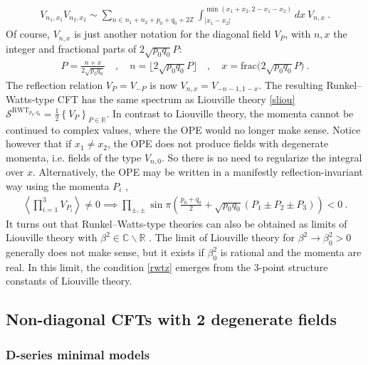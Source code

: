 \documentclass[12pt, a4paper]{article}
\begin{document}
\begin{align}
 \boxed{V_{n_1,x_1}V_{n_2,x_2} \sim \sum_{n\in n_1+n_2+p_0+q_0+2\mathbb{Z}}
\int_{|x_1-x_2|}^{\min (x_1+x_2,2-x_1-x_2)} dx\ V_{n, x}}\ .
\end{align}
Of course, $V_{n,x}$ is just another notation for the diagonal field $V_P$, with $n,x$ the integer and fractional parts of $2\sqrt{p_0q_0}P$:
\begin{align}
 P=\frac{n+x}{2\sqrt{p_0q_0}} \quad , \quad n=\Big\lfloor 2\sqrt{p_0q_0}P \Big\rfloor \quad , \quad x = \text{frac}\Big(2\sqrt{p_0q_0}P \Big)\ .
\end{align}
The reflection relation $V_P=V_{-P}$ is now $V_{n,x}=V_{-n-1,1-x}$. 
The resulting Runkel--Watts-type CFT has the same spectrum as Liouville theory \eqref{sliou} $
 \mathcal{S}^{\text{RWT}_{p_0,q_0}} = \frac12 \left\{ V_P\right\}_{P\in \mathbb{R}}$. In contrast to Liouville theory, the momenta cannot be continued to complex values, where the OPE would no longer make sense. Notice however that if $x_1\neq x_2$, the OPE does not produce fields with degenerate momenta, i.e. fields of the type $V_{n,0}$. So there is no need to regularize the integral over $x$. Alternatively, the OPE may be written in a manifestly reflection-invariant way using the momenta $P_i$ \cite{rs15},
 \begin{align}
  \left<\prod_{i=1}^3 V_{P_i}\right>\neq 0 \implies \prod_{\pm,\pm} \sin\pi\left(\tfrac{p_0+q_0}{2}+\sqrt{p_0q_0}(P_1\pm P_2\pm P_3)\right) < 0 \ .
  \label{rwtz}
 \end{align}
It turns out that Runkel--Watts-type theories can also be obtained as limits of Liouville theory with $\beta^2\in \mathbb{C}\backslash \mathbb{R}$ \cite{sch03, mce07}. The limit of Liouville theory for $\beta^2\to \beta_0^2>0$ generally does not make sense, but it exists if $\beta_0^2$ is rational and the momenta are real. In this limit, the condition \eqref{rwtz} emerges from the 3-point structure constants of Liouville theory.


\subsection{Non-diagonal CFTs with 2 degenerate fields}

\subsubsection{D-series minimal models}
\end{document}
